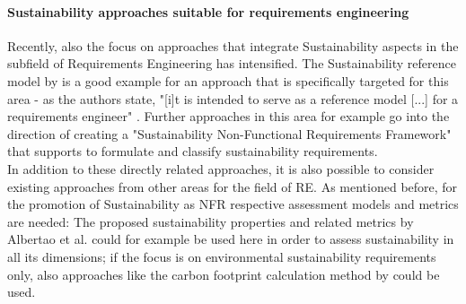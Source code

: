 \documentclass[oribibl]{llncs}
\begin{document}


\paragraph{Sustainability approaches suitable for requirements engineering}
Recently, also the focus on approaches that integrate Sustainability aspects in the subfield of Requirements Engineering has intensified. %
The Sustainability reference model by \cite{penzenstadler_generic_2013} is a good example for an approach that is specifically targeted for this area - as the authors state, "[i]t is intended to serve as a reference model [...] for a requirements engineer" \cite{penzenstadler_generic_2013} %
. Further approaches in this area for example go into the direction of creating a "Sustainability Non-Functional Requirements Framework" \cite{raturi_developing_2014} that supports to formulate and classify sustainability requirements. %
\\
In addition to these directly related approaches, it is also possible to consider existing approaches from other areas for the field of RE. As mentioned before, for the promotion of Sustainability as NFR respective assessment models and metrics are needed: The proposed sustainability properties and related metrics by Albertao et al. \cite{albertao_measuring_2010} could for example be used here in order to assess sustainability in all its dimensions; if the focus is on environmental sustainability requirements only, also approaches like the carbon footprint calculation method by \cite{kern_impacts_2015} could be used.

\end{document}
